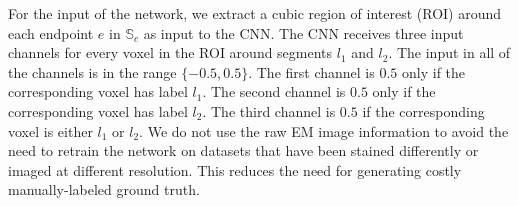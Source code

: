 For the input of the network, we extract a cubic region of interest (ROI) around each endpoint $e$ in $\mathbb{S}_c$ as input to the CNN. 
The CNN receives three input channels for every voxel in the ROI around segments $l_1$ and $l_2$. 
The input in all of the channels is in the range $\{-0.5, 0.5\}$. 
The first channel is $0.5$ only if the corresponding voxel has label $l_1$. 
The second channel is $0.5$ only if the corresponding voxel has label $l_2$. 
The third channel is $0.5$ if the corresponding voxel is either $l_1$ or $l_2$.
We do not use the raw EM image information to avoid the need to retrain the network on datasets that have been stained differently or imaged at different resolution. 
This reduces the need for generating costly manually-labeled ground truth. 




